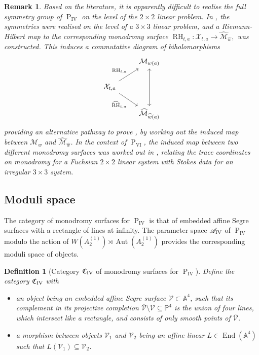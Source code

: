 \documentclass[a4paper,reqno]{amsart}
\numberwithin{equation}{section}
\newcommand{\p}{\mathbb{P}}
\newcommand{\pain}[1]{\operatorname{P}_{\mathrm{#1}}}
\DeclareMathOperator{\Aut}{Aut}
\newtheorem{definition}[theorem]{Definition}
\newtheorem{remark}[theorem]{Remark}
\numberwithin{equation}{section}
\begin{document}
\begin{remark} \label{rem:commutingRHsPIV}
Based on the literature, it is apparently difficult to realise the full symmetry group of $\pain{IV}$ on the level of the $2\times2$ linear problem. 
In \cite{puttop2013piv}, the symmetries were realised on the level of a $3\times3$ linear problem, and a Riemann-Hilbert map to the corresponding monodromy surface 
$\widehat{\operatorname{RH}}_{t,a}:\mathcal{X}_{t,a} \rightarrow \widehat{\mathcal{M}}_{\widehat{w}},$ 
was constructed. 
This induces a commutative diagram of biholomorphisms
\begin{equation*}
    \begin{tikzcd}
    & \mathcal{M}_{w(a)} \arrow[dd,leftrightarrow]\\
        \mathcal{X}_{t,a}  \arrow[ur, "\operatorname{RH}_{t,a}"] \arrow[dr,swap, "\widehat{\operatorname{RH}}_{t,a}"]& \\
    & \widehat{\mathcal{M}}_{\widehat{w}(a)}         
    \end{tikzcd}
\end{equation*}
providing an alternative pathway to prove , by working out the induced map between $\mathcal{M}_w$  and $\widehat{\mathcal{M}}_{\widehat{w}}$.
In the context of $\pain{VI}$, the induced map between two different monodromy surfaces was worked out in \cite{deganoguzzetti}, relating the trace coordinates on monodromy for a Fuchsian $2\times 2$ linear system with Stokes data for an irregular $3\times3$ system.
\end{remark}








\subsection{Moduli space}
The category of monodromy surfaces for $\pain{IV}$ is that of embedded affine Segre surfaces with a rectangle of lines at infinity.
The parameter space $\mathscr{A}_{\rm{IV}}$ of $\pain{IV}$ modulo the action of $W(A_2^{(1)})\rtimes \Aut(A_2^{(1)})$ provides the corresponding moduli space of objects.

\begin{definition}[Category $\mathfrak{C}_{\rm IV}$ of monodromy surfaces for $\pain{IV}$]
\label{def:categoryPIV}
Define the category $\mathfrak{C}_{\rm IV}$ with
\begin{itemize}
    \item an object being an embedded affine Segre surface $\mathcal{V}\subset \mathbb{A}^4$, such that its complement in its projective completion $\overline{\mathcal{V}}\setminus \mathcal{V}\subseteq \p^4$ is the union of four lines, which intersect like a rectangle, and consists of only smooth points of $\overline{\mathcal{V}}$. 
    \item a morphism between objects $\mathcal{V}_1$ and $\mathcal{V}_2$ being an affine linear $L \in \operatorname{End}(\mathbb{A}^4)$ such that $L(\mathcal{V}_1)\subseteq \mathcal{V}_2$.
\end{itemize}
\end{definition}
\end{document}
